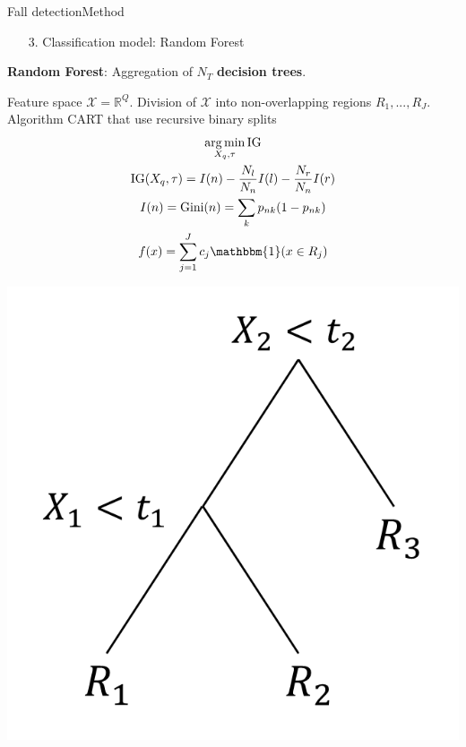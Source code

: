 \documentclass[8pt,t,aspectratio=1610]{beamer}
\DeclareMathOperator*{\argmin}{arg\,min}
\newcommand{\IG}{\mathrm{IG}}
\newcommand{\RR}{\mathbb{R}} %
\newcommand{\XX}{\mathcal{X}}
\begin{document}
\begin{frame}{Fall detection}{Method}
\begin{minipage}[t]{0.49\linewidth}
\end{minipage}\hfill
\begin{minipage}[t]{0.49\linewidth}
    \vspace{0pt}
    \begin{enumerate}
        \item[3.] Classification model: Random Forest \cite{Breiman2001}
    \end{enumerate}
    \textbf{Random Forest}: Aggregation of $N_T$ \textbf{decision trees}.
    \begin{tcolorbox}[title=Decision tree]
    \small
    Feature space $\XX = \RR^Q$.
    Division of $\XX$ into non-overlapping regions $R_1,...,R_J$.
    Algorithm CART that use recursive binary splits \cite{breiman84}
    \begin{gather*}
        \argmin_{X_{q}, \tau} \IG \\
        \IG(X_{q}, \tau) = I(n) - \frac{N_{l}}{N_n}I(l) - \frac{N_{r}}{N_{n}}I(r)\\
        I(n) = \mathrm{Gini}(n) = \sum_{k}p_{nk}(1-p_{nk})\\
        f(x) = \sum_{j=1}^{J}c_{j}\mathbbm{1}(x\in R_{j})
    \end{gather*}
    \end{tcolorbox}
    \begin{minipage}[t]{0.49\linewidth}
        \vspace{0pt}
        \centering
        \includegraphics[width=0.7\linewidth, trim= 0 0 0 0, clip]{schema_decision_tree_1.png}\\

\end{minipage}
\end{minipage}
\end{frame}
\end{document}
